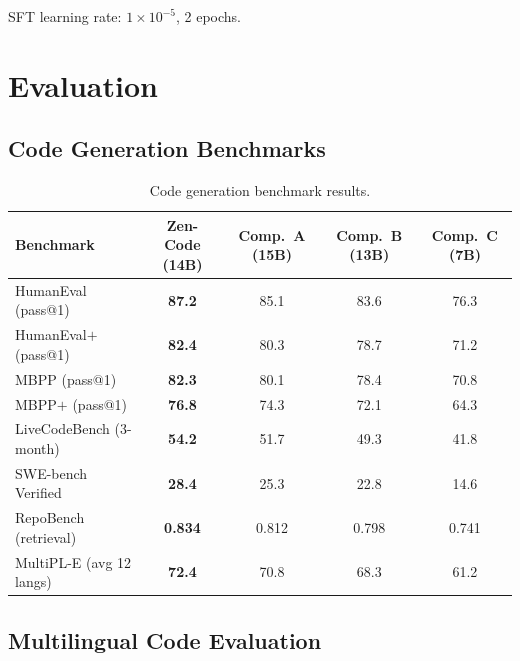 \documentclass[11pt,a4paper]{article}
\begin{document}
SFT learning rate: $1 \times 10^{-5}$, 2 epochs.

\section{Evaluation}

\subsection{Code Generation Benchmarks}

\begin{table}[H]
\centering
\caption{Code generation benchmark results.}
\label{tab:benchmarks}
\begin{tabular}{lcccc}
\toprule
\textbf{Benchmark} & \textbf{Zen-Code (14B)} & \textbf{Comp.\ A (15B)} & \textbf{Comp.\ B (13B)} & \textbf{Comp.\ C (7B)} \\
\midrule
HumanEval (pass@1)      & \textbf{87.2} & 85.1 & 83.6 & 76.3 \\
HumanEval$+$ (pass@1)   & \textbf{82.4} & 80.3 & 78.7 & 71.2 \\
MBPP (pass@1)           & \textbf{82.3} & 80.1 & 78.4 & 70.8 \\
MBPP$+$ (pass@1)        & \textbf{76.8} & 74.3 & 72.1 & 64.3 \\
LiveCodeBench (3-month) & \textbf{54.2} & 51.7 & 49.3 & 41.8 \\
\midrule
SWE-bench Verified      & \textbf{28.4} & 25.3 & 22.8 & 14.6 \\
RepoBench (retrieval)   & \textbf{0.834} & 0.812 & 0.798 & 0.741 \\
\midrule
MultiPL-E (avg 12 langs)& \textbf{72.4} & 70.8 & 68.3 & 61.2 \\
\bottomrule
\end{tabular}
\end{table}

\subsection{Multilingual Code Evaluation}
\end{document}
